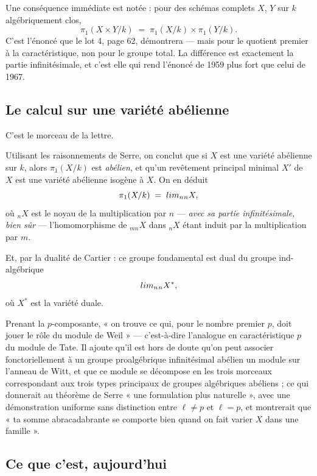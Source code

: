 \documentclass[11pt,a4paper]{article}
\begin{document}
Une conséquence immédiate est notée : pour des schémas complets $X$, $Y$ sur
$k$ algébriquement clos,
\[
  \pi_{1}(X \times Y/k) \;=\; \pi_{1}(X/k) \times \pi_{1}(Y/k) .
\]
C'est l'énoncé que le lot 4, page 62, démontrera --- mais pour le quotient
premier à la caractéristique, non pour le groupe total. La différence est
exactement la partie infinitésimale, et c'est elle qui rend l'énoncé de 1959
plus fort que celui de 1967.

\subsection*{Le calcul sur une variété abélienne}

C'est le morceau de la lettre.

Utilisant les raisonnements de Serre, on conclut que si $X$ est une variété
abélienne sur $k$, alors $\pi_{1}(X/k)$ est \emph{abélien}, et qu'un revêtement
principal minimal $X'$ de $X$ est une variété abélienne isogène à $X$. On en
déduit
\[
  \pi_{1}(X/k) \;=\; \varprojlim_{n} {}_{n}X ,
\]
où ${}_{n}X$ est le noyau de la multiplication par $n$ --- \emph{avec sa partie
infinitésimale, bien sûr} --- l'homomorphisme de ${}_{mn}X$ dans ${}_{n}X$
étant induit par la multiplication par $m$.

Et, par la dualité de Cartier : ce groupe fondamental est dual du groupe
ind-algébrique
\[
  \varinjlim_{n} {}_{n}X^{*} ,
\]
où $X^{*}$ est la variété duale.

Prenant la $p$-composante, « on trouve ce qui, pour le nombre premier $p$, doit
jouer le rôle du module de Weil » --- c'est-à-dire l'analogue en
caractéristique $p$ du module de Tate. Il ajoute qu'il est hors de doute qu'on
peut associer fonctoriellement à un groupe proalgébrique infinitésimal abélien
un module sur l'anneau de Witt, et que ce module se décompose en les trois
morceaux correspondant aux trois types principaux de groupes algébriques
abéliens ; ce qui donnerait au théorème de Serre « une formulation plus
naturelle », avec une démonstration uniforme sans distinction entre
$\ell \neq p$ et $\ell = p$, et montrerait que « ta somme abracadabrante se
comporte bien quand on fait varier $X$ dans une famille ».

\subsection*{Ce que c'est, aujourd'hui}
\end{document}
